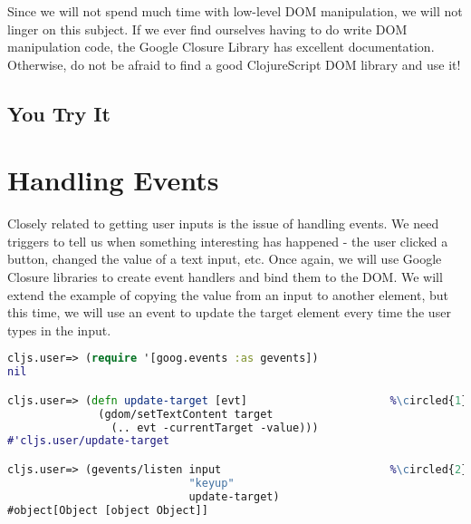 \documentclass[10pt,twoside,openright]{memoir}
\newcommand*\circled[1]{\tikz[baseline=(char.base)]{
            \node[shape=circle,draw,inner sep=1pt] (char) {#1};}}
\begin{document}
Since we will not spend much time with low-level DOM manipulation, we
will not linger on this subject. If we ever find ourselves having to do
write DOM manipulation code, the Google Closure Library has excellent
documentation. Otherwise, do not be afraid to find a good ClojureScript
DOM library and use it!


\subsection{You Try It}


\section{Handling Events}

Closely related to getting user inputs is the issue of handling events.
We need triggers to tell us when something interesting has happened -
the user clicked a button, changed the value of a text input, etc. Once
again, we will use Google Closure libraries to create event handlers and
bind them to the DOM. We will extend the example of copying the value
from an input to another element, but this time, we will use an event to
update the target element every time the user types in the input.

\begin{lstlisting}[language=Clojure, caption={Using events to trigger updates}]
cljs.user=> (require '[goog.events :as gevents])
nil

cljs.user=> (defn update-target [evt]                      %\circled{1}%
              (gdom/setTextContent target
                (.. evt -currentTarget -value)))
#'cljs.user/update-target

cljs.user=> (gevents/listen input                          %\circled{2}%
                            "keyup"
                            update-target)
#object[Object [object Object]]
\end{lstlisting}
\end{document}
